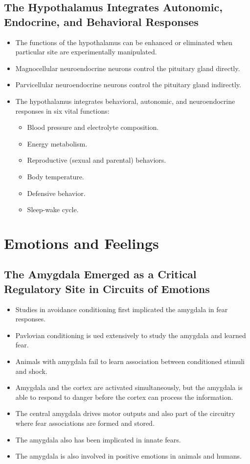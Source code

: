 \documentclass[12pt,a4paper]{article}
\begin{document}
\subsection{The Hypothalamus Integrates Autonomic, Endocrine, and Behavioral Responses}
\begin{itemize}
    \item The functions of the hypothalamus can be enhanced or eliminated when particular site are experimentally manipulated.
    \item Magnocellular neuroendocrine neurons control the pituitary gland directly.
    \item Parvicellular neuroendocrine neurons control the pituitary gland indirectly.
    \item The hypothalamus integrates behavioral, autonomic, and neuroendocrine responses in six vital functions:
        \begin{itemize}
            \item Blood pressure and electrolyte composition.
            \item Energy metabolism.
            \item Reproductive (sexual and parental) behaviors.
            \item Body temperature.
            \item Defensive behavior.
            \item Sleep-wake cycle.
        \end{itemize}
\end{itemize}


\clearpage
\section{Emotions and Feelings}
\subsection{The Amygdala Emerged as a Critical Regulatory Site in Circuits of Emotions}
\begin{itemize}
    \item Studies in avoidance conditioning first implicated the amygdala in fear responses.
    \item Pavlovian conditioning is ued extensively to study the amygdala and learned fear.
    \item Animals with amygdala fail to learn association between conditioned stimuli and shock.
    \item Amygdala and the cortex are activated simultaneously, but the amygdala is able to respond to danger before the cortex can process the information.
    \item The central amygdala drives motor outputs and also part of the circuitry where fear associations are formed and stored.
    \item The amygdala also has been implicated in innate fears.
    \item The amygdala is also involved in positive emotions in animals and humans.
\end{itemize}
\end{document}
